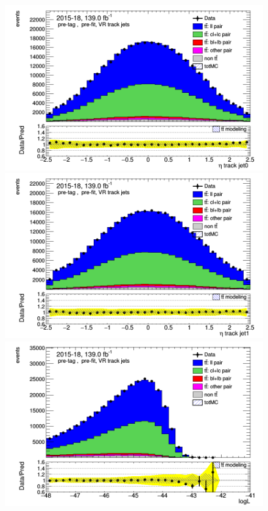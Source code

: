 \documentclass[letterpaper,12pt]{article}
\begin{document}
	
	\begin{figure}
	\begin{minipage}[b]{.45\textwidth}
	\centering
	\includegraphics[width=1\textwidth]{Oct_distributions/pretagNoRwDL1rwithhighpTVRJets_scaledall/DataMC_J0_eta.png}
	\end{minipage}\hfill
	\begin{minipage}[b]{.45\textwidth}
	\centering
	\includegraphics[width=1\textwidth]{Oct_distributions/pretagNoRwDL1rwithhighpTVRJets_scaledall/DataMC_J1_eta.png}
	\end{minipage}\hfill
	\begin{minipage}[b]{.45\textwidth}
	\centering
	\includegraphics[width=1\textwidth]{Oct_distributions/pretagNoRwDL1rwithhighpTVRJets_scaledall/DataMC_LLR.png}

\end{minipage}
\end{figure}
\end{document}
